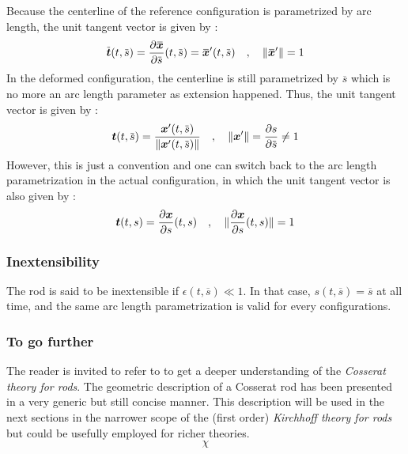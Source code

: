 Because the centerline of the reference configuration is parametrized by arc length, the unit tangent vector is given by :
\begin{equation}	
	\overbar{\vect{t}}(t, \overbar{s}) = \frac{\partial \overbar{\vect{x}}}{\partial \overbar{s}} (t, \overbar{s}) = \overbar{\vect{x}}'(t, \overbar{s})
	\quad , \quad
	\norm{\overbar{\vect{x}}'} = 1
\end{equation}
In the deformed configuration, the centerline is still parametrized by $\overbar{s}$ which is no more an arc length parameter as extension happened. Thus, the unit tangent vector is given by :
\begin{equation}	
	\vect{t}(t, \overbar{s}) = \frac{{\vect{x}}'(t, \overbar{s})}{\norm{{\vect{x}}'(t, \overbar{s})}}
	\quad , \quad
	\norm{\vect{x}'} = \frac{\partial s}{\partial \overbar{s}}  \neq 1
\end{equation}
However, this is just a convention and one can switch back to the arc length parametrization in the actual configuration, in which the unit tangent vector is also given by :
\begin{equation}	
	\boldsymbol{t}(t, s) = \frac{\partial \boldsymbol{x}}{\partial s} (t, s)
	\quad , \quad
	\lVert \frac{\partial \boldsymbol{x}}{\partial s} (t, s)\rVert = 1
\end{equation}

\subsubsection{Inextensibility}

The rod is said to be inextensible if $\epsilon(t, \overbar{s}) \ll 1$. In that case, $s(t, \overbar{s}) = \overbar{s}$ at all time, and the same arc length parametrization is valid for every configurations.

\subsubsection{To go further}

The reader is invited to refer to \cite{Antman2005} to get a deeper understanding of the \emph{Cosserat theory for rods}. The geometric description of a Cosserat rod has been presented in a very generic but still concise manner. This description will be used in the next sections in the narrower scope of the (first order) \emph{Kirchhoff theory for rods} but could be usefully employed for richer theories. 
\begin{equation}	
	\chi
\end{equation}

